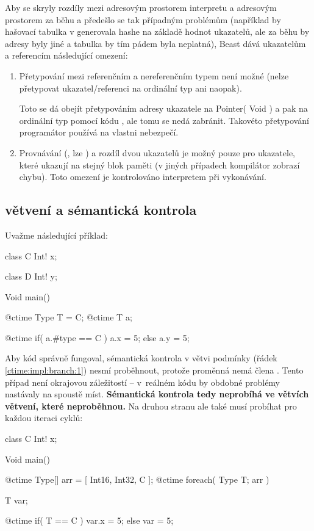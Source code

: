 Aby se skryly rozdíly mezi adresovým prostorem interpretu a adresovým prostorem za běhu a předešlo se tak případným problémům (například by hašovací tabulka v \ctime generovala hashe na základě hodnot ukazatelů, ale za běhu by adresy byly jiné a tabulka by tím pádem byla neplatná), Beast dává \ctime ukazatelům a referencím následující omezení:
\begin{enumerate}
	\item Přetypování mezi referenčním a nereferenčním typem není možné (nelze přetypovat ukazatel/referenci na ordinální typ ani naopak).
	
	Toto se dá obejít přetypováním adresy ukazatele na Pointer( Void ) a pak na ordinální typ pomocí kódu , ale tomu se nedá zabránit. Takovéto přetypování programátor používá na vlastni nebezpečí.
	
	\item Provnávání (\inlineCode{< > <= >=}, lze ) a rozdíl dvou ukazatelů je možný pouze pro ukazatele, které ukazují na stejný blok paměti (v jiných případech kompilátor zobrazí chybu). Toto omezení je kontrolováno interpretem při vykonávání.
\end{enumerate}

\subsection{\ctime větvení a sémantická kontrola}

Uvažme následující příklad:
\begin{code}
class C {
	Int! x;
}

class D {
	Int! y;
}
	
Void main() {
	@ctime Type T = C;
	@ctime T a;
	
	@ctime if( a.#type == C )
		a.x = 5;
	else
		a.y = 5; $\label{ctime:impl:branch:1}$
}
\end{code}

Aby kód správně fungoval, sémantická kontrola v  větvi podmínky (řádek \ref{ctime:impl:branch:1}) nesmí proběhnout, protože proměnná  nemá člena . Tento případ není okrajovou záležitostí -- v~reálném \ctime kódu by obdobné problémy nastávaly na spoustě míst. \textbf{Sémantická kontrola tedy neprobíhá ve větvích \ctime větvení, které neproběhnou.} Na druhou stranu ale také musí probíhat pro každou iteraci cyklů:

\begin{code}
class C { 
	Int! x;
}
	
Void main() {
	@ctime Type[] arr = [ Int16, Int32, C ];
	@ctime foreach( Type T; arr ) {
		T var;
		
		@ctime if( T == C )
			var.x = 5;
		else
			var = 5;
	}
}
\end{code}

